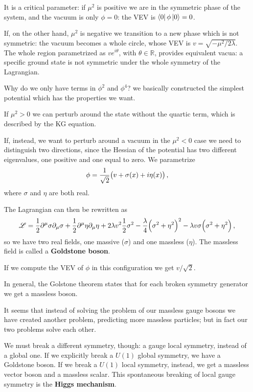 \documentclass[main.tex]{subfiles}
\begin{document}
It is a critical parameter: if \(\mu^2\) is positive we are in the symmetric phase of the system, and the vacuum is only \(\phi = 0\): the VEV is \(\bra{0} \phi \ket{0} = 0\). 

If, on the other hand, \(\mu^2\) is negative we transition to a new phase which is not symmetric: the vacuum becomes a whole circle, whose VEV is \(v = \sqrt{- \mu^2 / 2 \lambda }\). The whole region parametrized as \(v e^{i \theta }\), with \(\theta \in \mathbb{R}\), provides equivalent vacua:
a specific ground state is not symmetric under the whole symmetry of the Lagrangian.

Why do we only have terms in \(\phi^2\) and \(\phi^{4}\)? we basically constructed the simplest potential which has the properties we want.

If \(\mu^2>0\) we can perturb around the state without the quartic term, which is described by the KG equation.

If, instead, we want to perturb around a vacuum in the \(\mu^2<0\) case we need to distinguish two directions, since the Hessian of the potential has two different eigenvalues, one positive and one equal to zero. We parametrize 
%
\begin{align}
\phi = \frac{1}{\sqrt{2}} \qty(v + \sigma (x) + i\eta (x))
\,,
\end{align}
%
where \(\sigma \) and \(\eta \) are both real. 

The Lagrangian can then be rewritten as 
%
\begin{align}
\mathscr{L} = \frac{1}{2} \partial^{\mu } \sigma \partial_{\mu } \sigma 
+ \frac{1}{2} \partial^{\mu } \eta \partial_{\mu } \eta 
+ 2 \lambda v^2 \frac{1}{2} \sigma^2 
- \frac{\lambda}{4} \qty(\sigma^2 + \eta^2)^2
- \lambda v \sigma \qty(\sigma^2 + \eta^2)
\,,
\end{align}
%
so we have two real fields, one massive  (\(\sigma \)) and one massless (\(\eta \)). The massless field is called a \textbf{Goldstone boson}.

If we compute the VEV of \(\phi \) in this configuration we get     \(v / \sqrt{2 }\). 

In general, the Golstone theorem states that for each broken symmetry generator we get a massless boson. 

It seems that instead of solving the problem of our massless gauge bosons we have created another problem, predicting more massless particles; but in fact our two problems solve each other.

We must break a different symmetry, though: a gauge local symmetry, instead of a global one.
If we explicitly break a \(U(1)\) global symmetry, we have a Goldstone boson.
If we break a \(U(1)\) local symmetry, instead, we get a massless vector boson and a massless scalar.
This spontaneous breaking of local gauge symmetry is the \textbf{Higgs mechanism}.
\end{document}
